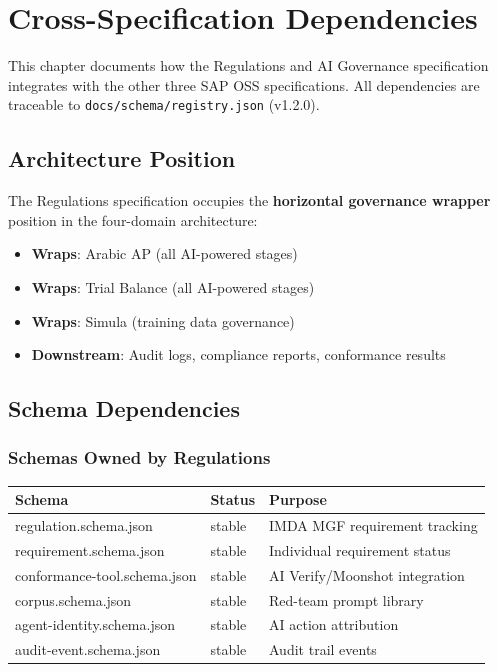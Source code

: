 
\chapter{Cross-Specification Dependencies}
\label{ch:cross-spec}

This chapter documents how the Regulations and AI Governance specification
integrates with the other three SAP OSS specifications. All dependencies
are traceable to \texttt{docs/schema/registry.json} (v1.2.0).

\section{Architecture Position}
\label{sec:arch-position}

The Regulations specification occupies the \textbf{horizontal governance wrapper}
position in the four-domain architecture:

\begin{itemize}
  \item \textbf{Wraps}: Arabic AP (all AI-powered stages)
  \item \textbf{Wraps}: Trial Balance (all AI-powered stages)
  \item \textbf{Wraps}: Simula (training data governance)
  \item \textbf{Downstream}: Audit logs, compliance reports, conformance results
\end{itemize}

\section{Schema Dependencies}
\label{sec:schema-deps}

\subsection{Schemas Owned by Regulations}

\begin{tabularx}{\linewidth}{@{}l l X@{}}
\toprule
\textbf{Schema} & \textbf{Status} & \textbf{Purpose} \\
\midrule
regulation.schema.json & stable & IMDA MGF requirement tracking \\
requirement.schema.json & stable & Individual requirement status \\
conformance-tool.schema.json & stable & AI Verify/Moonshot integration \\
corpus.schema.json & stable & Red-team prompt library \\
agent-identity.schema.json & stable & AI action attribution \\
audit-event.schema.json & stable & Audit trail events \\
\bottomrule
\end{tabularx}

